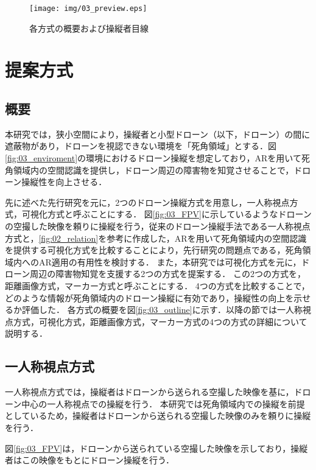 \documentclass[submit]{ipsj}
\begin{document}
  \begin{figure*}[!tb]
    \centering
    \texttt{[image: img/03\_preview.eps]}
    \caption{各方式の概要および操縦者目線}
    \label{fig:03_preview}
  \end{figure*}
  



\section{提案方式}
\subsection{概要}
本研究では，狭小空間により，操縦者と小型ドローン（以下，ドローン）の間に遮蔽物があり，ドローンを視認できない環境を「死角領域」とする．図\ref{fig:03_enviroment}の環境におけるドローン操縦を想定しており，ARを用いて死角領域内の空間認識を提供し，ドローン周辺の障害物を知覚させることで，ドローン操縦性を向上させる．
\par
先に述べた先行研究\cite{Erat}を元に，2つのドローン操縦方式を用意し，一人称視点方式，可視化方式と呼ぶことにする．
図\ref{fig:03_FPV}に示しているようなドローンの空撮した映像を頼りに操縦を行う，従来のドローン操縦手法である一人称視点方式と，\ref{fig:02_relation}を参考に作成した，ARを用いて死角領域内の空間認識を提供する可視化方式を比較することにより，先行研究の問題点である，死角領域内へのAR適用の有用性を検討する．
また，本研究では可視化方式を元に，ドローン周辺の障害物知覚を支援する2つの方式を提案する．
この2つの方式を，距離画像方式，マーカー方式と呼ぶことにする．
4つの方式を比較することで，どのような情報が死角領域内のドローン操縦に有効であり，操縦性の向上を示せるか評価した．
各方式の概要を図\ref{fig:03_outline}に示す．以降の節では一人称視点方式，可視化方式，距離画像方式，マーカー方式の4つの方式の詳細について説明する．


\subsection{一人称視点方式}
一人称視点方式では，操縦者はドローンから送られる空撮した映像を基に，ドローン中心の一人称視点での操縦を行う．
本研究では死角領域内での操縦を前提としているため，操縦者はドローンから送られる空撮した映像のみを頼りに操縦を行う．
\par
図\ref{fig:03_FPV}は，ドローンから送られている空撮した映像を示しており，操縦者はこの映像をもとにドローン操縦を行う．
\end{document}
